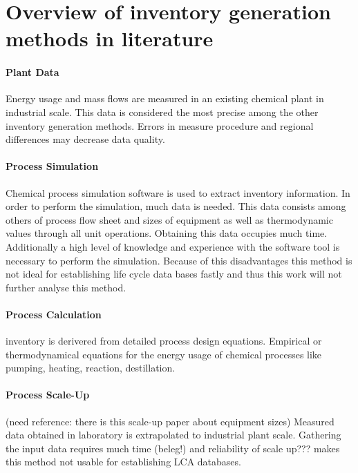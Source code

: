 \section{Overview of inventory generation methods in literature}




    \paragraph{Plant Data}Energy usage and mass flows are  measured in an existing chemical plant in industrial scale. This data is considered the most precise among the other inventory generation methods. Errors in measure procedure and regional differences may decrease data quality. 
    
    

    \paragraph{Process Simulation}Chemical process simulation software is used to extract inventory information. In order to perform the simulation, much data is needed. This data consists among others of process flow sheet and sizes of equipment as well as thermodynamic values through all unit operations. Obtaining this data occupies much time. Additionally a high level of knowledge and experience with the software tool is necessary to perform the simulation. Because of this disadvantages this method is not ideal for establishing life cycle data bases fastly and thus this work will not further analyse this method.
    \paragraph{Process Calculation}inventory is derivered from detailed process design equations. Empirical or thermodynamical equations for the energy usage of chemical processes like pumping, heating, reaction, destillation. 
    \paragraph{Process Scale-Up} (need reference: there is this scale-up paper about equipment sizes) Measured data obtained in laboratory is extrapolated to industrial plant scale. Gathering the input data requires much time (beleg!) and reliability of scale up???  makes this method not usable for establishing LCA databases.
